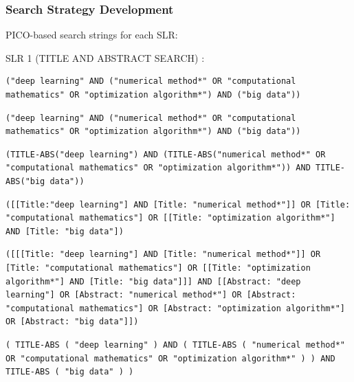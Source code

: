 \documentclass[acmsmall]{acmart}
\begin{document}
\subsubsection{Search Strategy Development}\label{subsubsec:phase-1-planning-and-protocol-development:search-strategy-development}
PICO-based search strings for each SLR:

SLR 1 (TITLE AND ABSTRACT SEARCH) :

\begin{lstlisting}[caption={General Search String},label={lst:general_search}]
    ("deep learning" AND ("numerical method*" OR "computational mathematics" OR "optimization algorithm*") AND ("big data"))
\end{lstlisting}

\begin{lstlisting}[caption={IEEE Explore Search String},label={lst:iee_explore}]
    ("deep learning" AND ("numerical method*" OR "computational mathematics" OR "optimization algorithm*") AND ("big data"))
\end{lstlisting}

\begin{lstlisting}[caption={Scopus Search String},label={lst:scopus}]
    (TITLE-ABS("deep learning") AND (TITLE-ABS("numerical method*" OR "computational mathematics" OR "optimization algorithm*")) AND TITLE-ABS("big data"))
\end{lstlisting}

\begin{lstlisting}[caption={Aisel Search String},label={lst:aisel}]
    ([[Title:"deep learning"] AND [Title: "numerical method*"]] OR [Title: "computational mathematics"] OR [[Title: "optimization algorithm*"] AND [Title: "big data"])
\end{lstlisting}

\begin{lstlisting}[caption={ACM Search String},label={lst:acm}]
    ([[[Title: "deep learning"] AND [Title: "numerical method*"]] OR [Title: "computational mathematics"] OR [[Title: "optimization algorithm*"] AND [Title: "big data"]]] AND [[Abstract: "deep learning"] OR [Abstract: "numerical method*"] OR [Abstract: "computational mathematics"] OR [Abstract: "optimization algorithm*"] OR [Abstract: "big data"]])
\end{lstlisting}

\begin{lstlisting}[caption={Springer Search String},label={lst:springer}]
    ( TITLE-ABS ( "deep learning" ) AND ( TITLE-ABS ( "numerical method*" OR "computational mathematics" OR "optimization algorithm*" ) ) AND TITLE-ABS ( "big data" ) )
\end{lstlisting}
\end{document}
